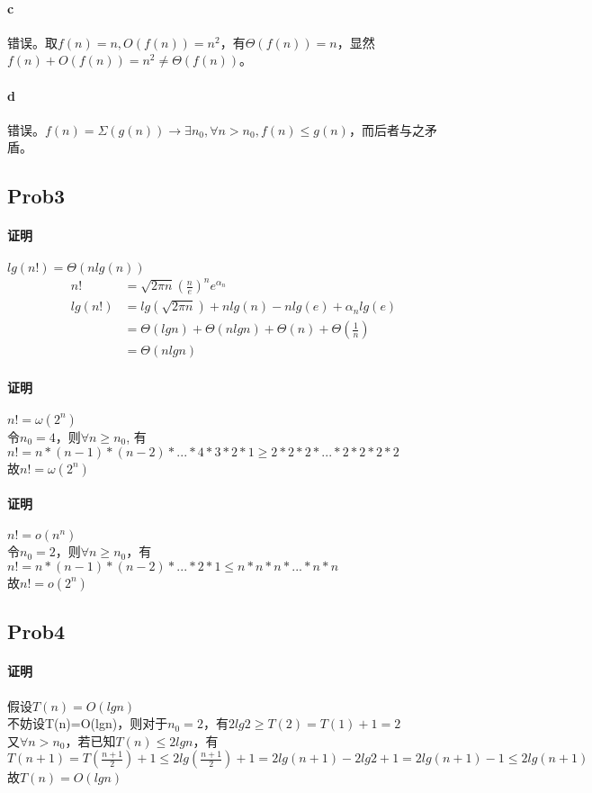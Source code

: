 \documentclass{ctexart}
\begin{document}
\paragraph{c} 错误。取$f(n)=n,O(f(n))=n^2$，有$\Theta (f(n))=n$，显然$f(n)+O(f(n))=n^2\not= \Theta(f(n))$。
\paragraph{d} 错误。$f(n)=\Sigma (g(n)) \to \exists n_0, \forall n>n_0, f(n)\leq g(n)$，而后者与之矛盾。

\subsection{Prob3}
\paragraph{证明}$lg(n!)=\Theta(nlg(n))$
\begin{align*}
    n! &=\sqrt{2\pi n}(\frac{n}{e})^n e^{\alpha_n} \\
    lg(n!) &=lg(\sqrt{2\pi n})+nlg(n)-nlg(e)+\alpha_n lg(e) \\
           &=\Theta(lgn)+\Theta(nlgn)+\Theta(n)+\Theta(\frac{1}{n})\\
           &=\Theta(nlgn)
\end{align*}
\paragraph{证明}$n!=\omega(2^n)$\\
令$n_0=4$，则$\forall n\ge n_0$, 有\\
$n!=n*(n-1)*(n-2)*...*4*3*2*1 \ge 2*2*2*...*2*2*2*2$\\
故$n! = \omega(2^n)$\\
\paragraph{证明}$n!=o(n^n)$\\
令$n_0=2$，则$\forall n\ge n_0$，有\\
$n!=n*(n-1)*(n-2)*...*2*1 \leq n*n*n*...*n*n $\\
故$n! = o(2^n)$

\subsection{Prob4}
\paragraph{证明}假设$T(n)=O(lgn)$\\
不妨设T(n)=O(lgn)，则对于$n_0=2$，有$2lg2 \ge T(2)=T(1)+1=2$\\
又$\forall n>n_0$，若已知$T(n)\le 2lgn$，有$T(n+1)=T(\frac{n+1}{2})+1 \le 2lg(\frac{n+1}{2})+1=2lg(n+1)-2lg2+1=2lg(n+1)-1 \le 2lg(n+1)$\\
故$T(n)=O(lgn)$
\end{document}
